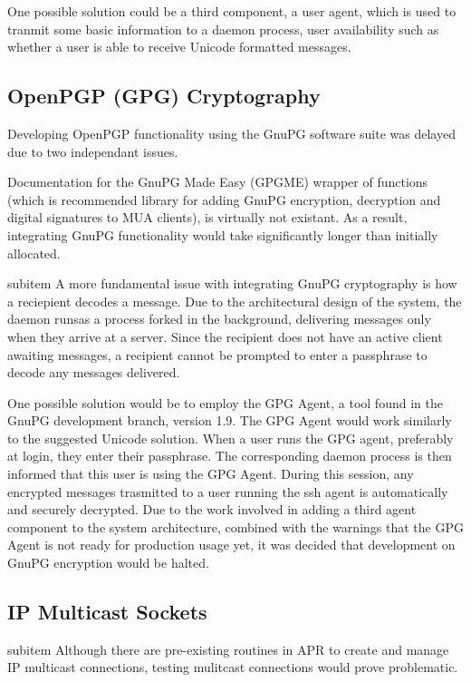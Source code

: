 One possible solution could be a third component, a user
agent, which is used to tranmit some basic information to a daemon
process, user availability such as whether a user is able to receive 
Unicode formatted messages.

\subsection{OpenPGP (GPG) Cryptography}

Developing OpenPGP functionality using the GnuPG software
suite was delayed due to two independant issues.

Documentation for the GnuPG Made Easy (GPGME) wrapper of
functions (which is recommended library for adding GnuPG encryption,
decryption and digital signatures to MUA clients), is virtually not
existant. As a result, integrating GnuPG functionality would take
significantly longer than initially allocated.


subitem A more fundamental issue with integrating GnuPG cryptography 
is how a reciepient decodes a message. Due to the architectural 
design of the system, the daemon runsas a process forked in the 
background, delivering messages only when they arrive at a server. 
Since the recipient does not have an active client awaiting messages, 
a recipient cannot be prompted to enter a passphrase to decode any 
messages delivered. 

One possible solution would be to employ the GPG Agent, a 
tool found in the GnuPG development branch, version 1.9. The GPG
Agent would work similarly to the suggested Unicode solution. When a
user runs the GPG agent, preferably at login, they enter their
passphrase. The corresponding daemon process is then informed that
this user is using the GPG Agent. During this session, any encrypted 
messages trasmitted to a user running the ssh agent is automatically
and securely decrypted. Due to the work involved in adding a third
agent component to the system architecture, combined with the
warnings that the GPG Agent is not ready for production usage yet, it
was decided that development on GnuPG encryption would be halted.

\subsection{IP Multicast Sockets}

subitem Although there are pre-existing routines in APR to create and
manage IP multicast connections, testing mulitcast connections would
prove problematic. 

